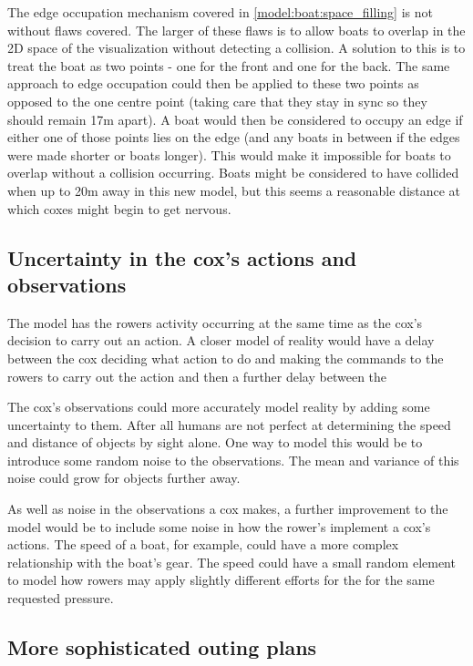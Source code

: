The edge occupation mechanism covered in \ref{model:boat:space_filling} is not without flaws covered. The larger of these flaws is to allow boats to overlap in the 2D space of the visualization without detecting a collision. A solution to this is to treat the boat as two points - one for the front and one for the back. The same approach to edge occupation could then be applied to these two points as opposed to the one centre point (taking care that they stay in sync so they should remain 17m apart). A boat would then be considered to occupy an edge if either one of those points lies on the edge (and any boats in between if the edges were made shorter or boats longer). This would make it impossible for boats to overlap without a collision occurring. Boats might be considered to have collided when up to 20m away in this new model, but this seems a reasonable distance at which coxes might begin to get nervous.

\subsection{Uncertainty in the cox's actions and observations}

The model has the rowers activity occurring at the same time as the cox's decision to carry out an action. A closer model of reality would have a delay between the cox deciding what action to do and making the commands to the rowers to carry out the action and then a further delay between the 

The cox's observations could more accurately model reality by adding some uncertainty to them. After all humans are not perfect at determining the speed and distance of objects by sight alone. One way to model this would be to introduce some random noise to the observations. The mean and variance of this noise could grow for objects further away.

As well as noise in the observations a cox makes, a further improvement to the model would be to include some noise in how the rower's implement a cox's actions. The speed of a boat, for example, could have a more complex relationship with the boat's gear. The speed could have a small random element to model how rowers may apply slightly different efforts for the for the same requested pressure.

\subsection{More sophisticated outing plans}

